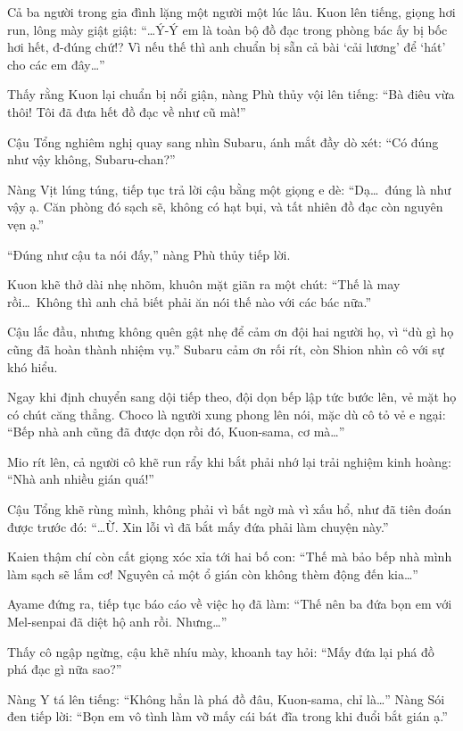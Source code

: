 \documentclass[../main.tex]{subfiles}
\begin{document}
Cả ba người trong gia đình lặng một người một lúc lâu. Kuon lên tiếng, giọng hơi run, lông mày giật giật: ``\dots Ý-Ý em là toàn bộ đồ đạc trong phòng bác ấy bị bốc hơi hết, đ-đúng chứ!? Vì nếu thế thì anh chuẩn bị sẵn cả bài `cải lương' để `hát' cho các em đây\dots''

Thấy rằng Kuon lại chuẩn bị nổi giận, nàng Phù thủy vội lên tiếng: ``Bà điêu vừa thôi! Tôi đã đưa hết đồ đạc về như cũ mà!''

Cậu Tổng nghiêm nghị quay sang nhìn Subaru, ánh mắt đầy dò xét: ``Có đúng như vậy không, Subaru-chan?''

Nàng Vịt lúng túng, tiếp tục trả lời cậu bằng một giọng e dè: ``Dạ\dots\ đúng là như vậy ạ. Căn phòng đó sạch sẽ, không có hạt bụi, và tất nhiên đồ đạc còn nguyên vẹn ạ.''

``Đúng như cậu ta nói đấy,'' nàng Phù thủy tiếp lời.

Kuon khẽ thở dài nhẹ nhõm, khuôn mặt giãn ra một chút: ``Thế là may rồi\dots\ Không thì anh chả biết phải ăn nói thế nào với các bác nữa.''

Cậu lắc đầu, nhưng không quên gật nhẹ để cảm ơn đội hai người họ, vì ``dù gì họ cũng đã hoàn thành nhiệm vụ.'' Subaru cảm ơn rối rít, còn Shion nhìn cô với sự khó hiểu.

Ngay khi định chuyển sang dội tiếp theo, đội dọn bếp lập tức bước lên, vẻ mặt họ có chút căng thẳng. Choco là người xung phong lên nói, mặc dù cô tỏ vẻ e ngại: ``Bếp nhà anh cũng đã được dọn rồi đó, Kuon-sama, cơ mà\dots''

Mio rít lên, cả người cô khẽ run rẩy khi bắt phải nhớ lại trải nghiệm kinh hoàng: ``Nhà anh nhiều gián quá!''

Cậu Tổng khẽ rùng mình, không phải vì bất ngờ mà vì xấu hổ, như đã tiên đoán được trước đó: ``\dots Ừ. Xin lỗi vì đã bắt mấy đứa phải làm chuyện này.''

Kaien thậm chí còn cất giọng xóc xỉa tới hai bố con: ``Thế mà bảo bếp nhà mình làm sạch sẽ lắm cơ! Nguyên cả một ổ gián còn không thèm động đến kia\dots''

Ayame đứng ra, tiếp tục báo cáo về việc họ đã làm: ``Thế nên ba đứa bọn em với Mel-senpai đã diệt hộ anh rồi. Nhưng\dots''

Thấy cô ngập ngừng, cậu khẽ nhíu mày, khoanh tay hỏi: ``Mấy đứa lại phá đồ phá đạc gì nữa sao?''

Nàng Y tá lên tiếng: ``Không hẳn là phá đồ đâu, Kuon-sama, chỉ là\dots'' Nàng Sói đen tiếp lời: ``Bọn em vô tình làm vỡ mấy cái bát đĩa trong khi đuổi bắt gián ạ.''
\end{document}
